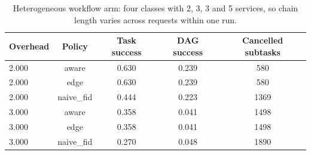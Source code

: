 \begin{table}
\centering
\footnotesize
\caption{Heterogeneous workflow arm: four classes with 2, 3, 3 and 5 services, so chain length varies across requests within one run.}
\label{tab:p2-workflow-mixed}
\begin{tabular}{lcccc}
\toprule
Overhead & Policy & Task success & DAG success & Cancelled subtasks \\
\midrule
2.000 & aware & 0.630 & 0.239 & 580 \\
2.000 & edge & 0.630 & 0.239 & 580 \\
2.000 & naive\_fid & 0.444 & 0.223 & 1369 \\
3.000 & aware & 0.358 & 0.041 & 1498 \\
3.000 & edge & 0.358 & 0.041 & 1498 \\
3.000 & naive\_fid & 0.270 & 0.048 & 1890 \\
\bottomrule
\end{tabular}
\par\vspace{2pt}{\footnotesize\raggedright Unlike the single-DAG arm, request-level success is non-zero: the short chains complete, the long ones are where deadlines and cancellations concentrate.\par}
\end{table}
